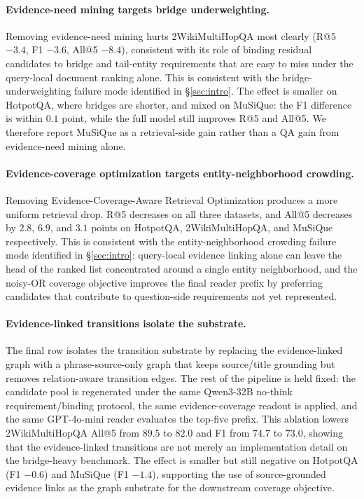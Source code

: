 \paragraph{Evidence-need mining targets bridge underweighting.}
Removing evidence-need mining hurts 2WikiMultiHopQA most clearly
(R@5 $-3.4$, F1 $-3.6$, All@5 $-8.4$), consistent with its role of
binding residual candidates to bridge and tail-entity requirements
that are easy to miss under the query-local document ranking alone.
This is consistent with the bridge-underweighting failure mode identified in
\S\ref{sec:intro}. The effect is smaller on HotpotQA, where bridges
are shorter, and mixed on MuSiQue: the F1 difference is within
$0.1$ point, while the full model still improves R@5 and All@5. We
therefore report MuSiQue as a retrieval-side gain rather than a QA
gain from evidence-need mining alone.

\paragraph{Evidence-coverage optimization targets entity-neighborhood crowding.}
Removing Evidence-Coverage-Aware Retrieval Optimization produces a
more uniform retrieval drop. R@5 decreases on all three datasets, and
All@5 decreases by $2.8$, $6.9$, and $3.1$ points on HotpotQA,
2WikiMultiHopQA, and MuSiQue respectively. This is consistent with
the entity-neighborhood crowding failure mode identified in
\S\ref{sec:intro}: query-local evidence linking alone can leave the head of
the ranked list concentrated around a single entity neighborhood, and
the noisy-OR coverage objective improves the final reader prefix by
preferring candidates that contribute to question-side requirements
not yet represented.

\paragraph{Evidence-linked transitions isolate the substrate.}
The final row isolates the transition substrate by replacing the
evidence-linked graph with a phrase-source-only graph that keeps
source/title grounding but removes relation-aware transition edges.
The rest of the pipeline is held fixed: the candidate pool is
regenerated under the same Qwen3-32B no-think requirement/binding
protocol, the same evidence-coverage readout is applied, and the same
GPT-4o-mini reader evaluates the top-five prefix. This ablation lowers
2WikiMultiHopQA All@5 from $89.5$ to $82.0$ and F1 from $74.7$ to
$73.0$, showing that the evidence-linked transitions are not merely an
implementation detail on the bridge-heavy benchmark. The effect is
smaller but still negative on HotpotQA (F1 $-0.6$) and MuSiQue
(F1 $-1.4$), supporting the use of source-grounded evidence links as
the graph substrate for the downstream coverage objective.

